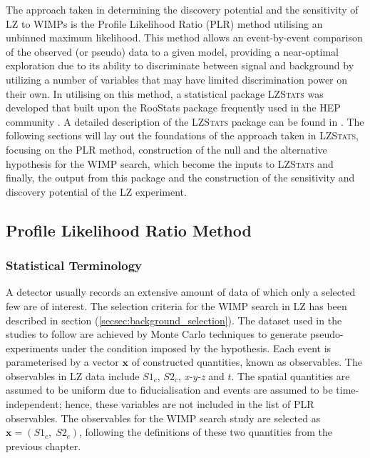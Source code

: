 The approach taken in determining the discovery potential and the sensitivity of LZ to WIMPs is the Profile Likelihood Ratio (PLR) method \cite{Rolke_2005} utilising an unbinned maximum likelihood. This method allows an event-by-event comparison of the observed (or pseudo) data to a given model, providing a near-optimal exploration due to its ability to discriminate between signal and background by utilizing a number of variables that may have limited discrimination power on their own. In utilising on this method, a statistical package \textsc{LZStats} was developed that built upon the RooStats package frequently used in the HEP community \cite{moneta2010roostats}. A detailed description of the \textsc{LZStats} package can be found in \cite{ibles}. The following sections will lay out the foundations of the approach taken in \textsc{LZStats}, focusing on the PLR method, construction of the null and the alternative hypothesis for the WIMP search, which become the inputs to \textsc{LZStats} and finally, the output from this package and the construction of the sensitivity and discovery potential of the LZ experiment.


\subsection{Profile Likelihood Ratio Method}
\label{secsec:statistical_terminology}

\subsubsection{Statistical Terminology}

A detector usually records an extensive amount of data of which only a selected few are of interest. The selection criteria for the WIMP search in LZ has been described in section (\ref{secsec:background_selection}). The dataset used in the studies to follow are achieved by Monte Carlo techniques to generate pseudo-experiments under the condition imposed by the hypothesis. Each event is parameterised by a vector $\pmb{x}$ of constructed quantities, known as observables. The observables in LZ data include $S1_{c}$, $S2_{c}$, \textit{x-y-z} and $t$. The spatial quantities are assumed to be uniform due to fiducialisation and events are assumed to be time-independent; hence, these variables are not included in the list of PLR observables. The observables for the WIMP search study are selected as $\pmb{x} = (S1_{c}, \; S2_{c})$, following the definitions of these two quantities from the previous chapter.

